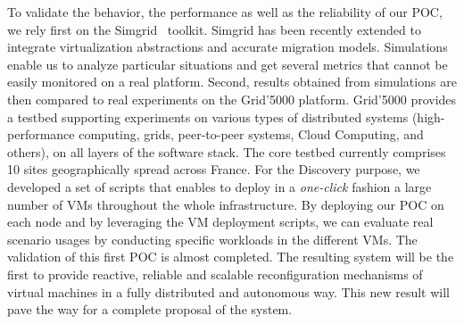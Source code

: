 To validate the behavior, the performance as well as the reliability of our
POC, we rely first on the Simgrid~\cite{Casanova:2008:SGF:1397760.1398183}
toolkit. Simgrid has been recently extended to integrate virtualization abstractions and accurate migration models. 
Simulations enable us to analyze particular situations and get several metrics
that cannot be easily monitored  on a real platform.
Second, results obtained from simulations are then compared to real experiments on the Grid'5000 platform. 
Grid'5000 provides a testbed supporting experiments on various types of
distributed systems (high-performance computing, grids, peer-to-peer systems,
Cloud Computing, and others), on all layers of the software stack. The core
testbed currently comprises 10 sites geographically spread across France. 
For the Discovery purpose, we developed a set of scripts that enables to deploy in a \emph{one-click} fashion a large number of VMs throughout 
the whole infrastructure\cite{flauncher}. By deploying our POC on each node and by
leveraging the VM deployment scripts, we can evaluate real scenario usages by conducting specific workloads in the different VMs. 
The validation of this first POC is almost completed. 
The resulting system will be the first to provide reactive,
reliable and scalable
reconfiguration mechanisms of virtual machines in a fully distributed and
autonomous way. This new result will pave the way for a complete proposal of
the \discovery system. 



